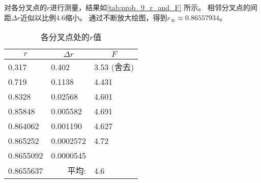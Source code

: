 对各分叉点的$r$进行测量，结果如\autoref{tab:prob_9_r_and_F} 所示。
相邻分叉点的间距$\Delta r$近似以比例4.6缩小。
通过不断放大绘图，得到$r_\infty \approx 0.86557934$。

\begin{table}
    \centering
    \caption{各分叉点处的$r$值}
    \label{tab:prob_9_r_and_F}
    \begin{tabular}{lll}
    \toprule
    \multicolumn{1}{c}{$r$} & \multicolumn{1}{c}{$\Delta r$} & \multicolumn{1}{c}{$F$} \\ \midrule
    0.317 & 0.402 & 3.53 (舍去) \\
    0.719 & 0.1138 & 4.431 \\
    0.8328 & 0.02568 & 4.601 \\
    0.85848 & 0.005582 & 4.691 \\
    0.864062 & 0.001190 & 4.627 \\
    0.865252 & 0.0002572 & 4.72 \\
    0.8655092 & 0.0000545 &  \\
    0.8655637 & \multicolumn{1}{r}{平均:}& 4.6 \\ \bottomrule
    \end{tabular}
\end{table}
